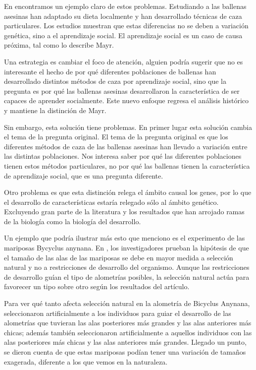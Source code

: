 En \cite{Uller2019} encontramos un ejemplo claro de estos problemas. Estudiando a las ballenas asesinas han adaptado su dieta localmente y han desarrollado técnicas de caza particulares. Los estudios muestran que estas diferencias no se deben a variación genética, sino a el aprendizaje social. El aprendizaje social es un caso de causa próxima, tal como lo describe Mayr.

Una estrategia es cambiar el foco de atención, alguien podría sugerir que no es interesante el hecho de por qué diferentes poblaciones de ballenas han desarrollado distintos métodos de caza por aprendizaje social, sino que la pregunta es por qué las ballenas asesinas desarrollaron la característica de ser capaces de aprender socialmente. Este nuevo enfoque regresa el análisis histórico y mantiene la distinción de Mayr.

Sin embargo, esta solución tiene problemas. En primer lugar esta solución cambia el tema de la pregunta original. El tema de la pregunta original es que los diferentes métodos de caza de las ballenas asesinas han llevado a variación entre las distintas poblaciones. Nos interesa saber por qué las diferentes poblaciones tienen estos métodos particulares, no por qué las ballenas tienen la característica de aprendizaje social, que es una pregunta diferente.

Otro problema es que esta distinción relega el ámbito causal los genes, por lo que el desarrollo de características estaría relegado sólo al ámbito genético. Excluyendo gran parte de la literatura y los resultados que han arrojado ramas de la biología como la biología del desarrollo.

Un ejemplo que podría ilustrar más esto que menciono es el experimento de las mariposas Bycyclus anynana. En \cite{Frankino2007}, los investigadores prueban la hipótesis de que el tamaño de las alas de las mariposas se debe en mayor medida a selección natural y no a restricciones de desarrollo del organismo. Aunque las restricciones de desarrollo guían el tipo de alometrías posibles, la selección natural actúa para favorecer un tipo sobre otro según los resultados del artículo.

Para ver qué tanto afecta selección natural en la alometría de Bicyclus Anynana, seleccionaron artificialmente a los individuos para guiar el desarrollo de las alometrías que tuvieran las alas posteriores más grandes y las alas anteriores más chicas; además también seleccionaron artificialmente a aquellos individuos con las alas posteriores más chicas y las alas anteriores más grandes. Llegado un punto, se dieron cuenta de que estas mariposas podían tener una variación de tamaños exagerada, diferente a los que vemos en la naturaleza.

